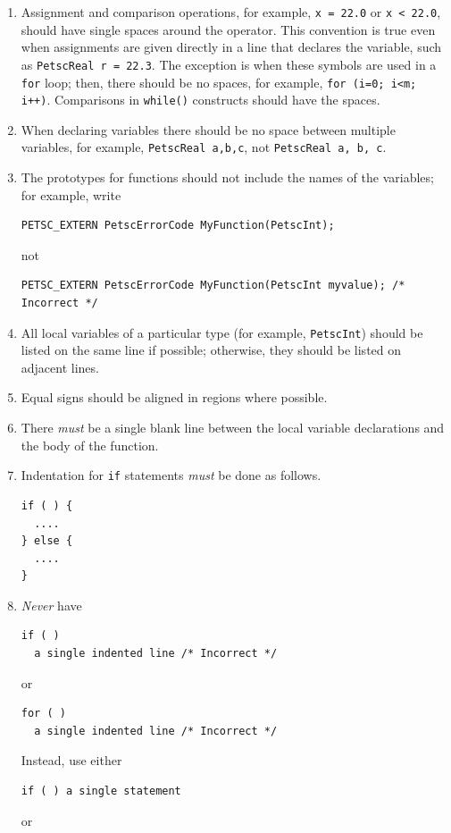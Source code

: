 \begin{enumerate}
\item Assignment and comparison operations, for example, \lstinline{x = 22.0} or
\lstinline{x < 22.0}, should have single spaces around the operator.
This convention is true even when assignments are given directly in a line that declares
the variable, such as \lstinline{PetscReal r = 22.3}. The exception is when
these symbols are used in a \lstinline{for} loop; then, there should be no spaces,
for example, \lstinline{for (i=0; i<m; i++)}. Comparisons in \lstinline{while()}
constructs should have the spaces.
\item When declaring variables there should be no space between multiple variables, for example, \lstinline{PetscReal a,b,c}, not \lstinline{PetscReal a, b, c}.
\item The prototypes for functions should not include the names of the variables; for example, write
\begin{lstlisting}
PETSC_EXTERN PetscErrorCode MyFunction(PetscInt);
\end{lstlisting}
not
\begin{lstlisting}
PETSC_EXTERN PetscErrorCode MyFunction(PetscInt myvalue); /* Incorrect */
\end{lstlisting}
\item All local variables of a particular type (for example, \lstinline{PetscInt}) should be
      listed on the same line if possible; otherwise, they should be listed
      on adjacent lines.
\item Equal signs should be aligned in regions where possible.
\item There {\em must} be a single blank line
      between the local variable declarations and the body of the function.
\item Indentation for \lstinline{if} statements {\em must}  be done  as follows.
\begin{lstlisting}
if ( ) {
  ....
} else {
  ....
}
\end{lstlisting}
\item {\em Never} have
\begin{lstlisting}
if ( )
  a single indented line /* Incorrect */
\end{lstlisting}
or
\begin{lstlisting}
for ( )
  a single indented line /* Incorrect */
\end{lstlisting}
Instead, use either
\begin{lstlisting}
if ( ) a single statement
\end{lstlisting}
or
\begin{lstlisting}

\end{lstlisting}
\end{enumerate}
